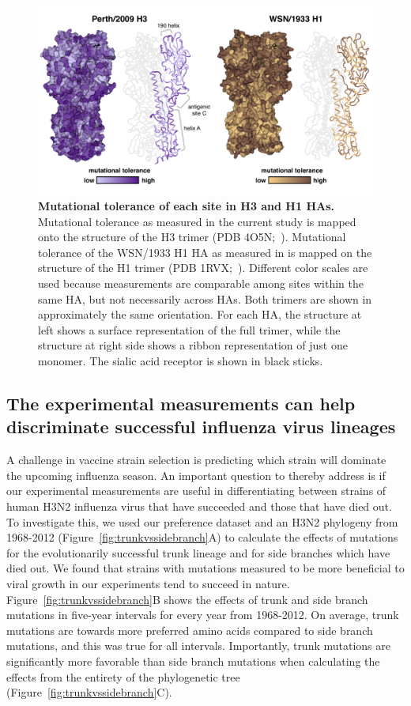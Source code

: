 \documentclass[9pt,twocolumn,twoside]{pnas-new}
\begin{document}
\begin{figure}
\centering
\includegraphics[width=11.4cm]{figs/mut_tolerance/entropy_heatmap.pdf}
\caption{\label{fig:mut_tolerance}
{\bf Mutational tolerance of each site in H3 and H1 HAs.}
Mutational tolerance as measured in the current study is mapped onto the structure of the H3 trimer (PDB 4O5N;~\cite{lee2014receptor}).
Mutational tolerance of the WSN/1933 H1 HA as measured in \cite{doud2016accurate} is mapped on the structure of the H1 trimer (PDB 1RVX;~\cite{gamblin2004structure}).
Different color scales are used because measurements are comparable among sites within the same HA, but not necessarily across HAs.
Both trimers are shown in approximately the same orientation. 
For each HA, the structure at left shows a surface representation of the full trimer, while the structure at right side shows a ribbon representation of just one monomer.
The sialic acid receptor is shown in black sticks.
}
\end{figure}

\subsection*{The experimental measurements can help discriminate successful influenza virus lineages}
A challenge in vaccine strain selection is predicting which strain will dominate the upcoming influenza season.
An important question to thereby address is if our experimental measurements are useful in differentiating between strains of human H3N2 influenza virus that have succeeded and those that have died out.
To investigate this, we used our preference dataset and an H3N2 phylogeny from 1968-2012 (Figure~\ref{fig:trunkvssidebranch}A) to calculate the effects of mutations for the evolutionarily successful trunk lineage and for side branches which have died out.
We found that strains with mutations measured to be more beneficial to viral growth in our experiments tend to succeed in nature.
Figure~\ref{fig:trunkvssidebranch}B shows the effects of trunk and side branch mutations in five-year intervals for every year from 1968-2012. 
On average, trunk mutations are towards more preferred amino acids compared to side branch mutations, and this was true for all intervals.
Importantly, trunk mutations are significantly more favorable than side branch mutations when calculating the effects from the entirety of the phylogenetic tree (Figure~\ref{fig:trunkvssidebranch}C).
\end{document}
